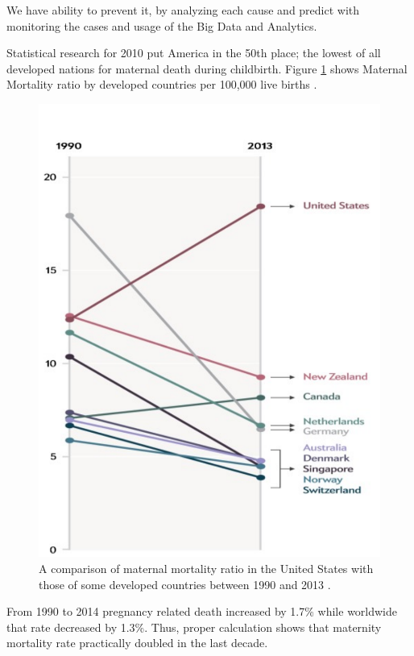 \documentclass[sigconf]{acmart}
\begin{document}
We have ability to prevent it, by analyzing each cause and predict with monitoring the cases and usage of the Big Data and Analytics. 

Statistical research for 2010 put America in the 50th place; the lowest of all developed nations for maternal death during childbirth\cite{bingham2011maternal}. Figure \ref{fig:figure1} shows Maternal Mortality ratio by developed countries per 100,000 live births \cite{maron2015has}.

\begin{figure}
  \centering
  \includegraphics[width=\columnwidth]{images/figure1.pdf}
  \caption{A comparison of maternal mortality ratio in the United States with those of some developed countries between 1990 and 2013 \cite{maron2015has}.} \label{fig:figure1} 
\end{figure}

From 1990 to 2014 pregnancy related death increased by 1.7\% while worldwide that rate decreased by 1.3\%. Thus, proper calculation shows that maternity mortality rate practically doubled in the last decade.
\end{document}
